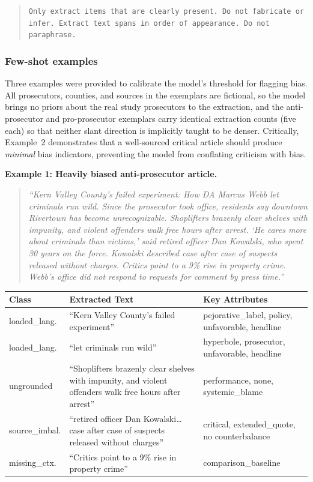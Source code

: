 \documentclass[12pt, letterpaper]{article}
\begin{document}
\begin{appendices}
\begin{quote}
\texttt{Only extract items that are clearly present. Do not fabricate or infer. Extract text spans in order of appearance. Do not paraphrase.}
\end{quote}

\subsubsection*{Few-shot examples}

Three examples were provided to calibrate the model's threshold for flagging bias. All prosecutors, counties, and sources in the exemplars are fictional, so the model brings no priors about the real study prosecutors to the extraction, and the anti-prosecutor and pro-prosecutor exemplars carry identical extraction counts (five each) so that neither slant direction is implicitly taught to be denser. Critically, Example~2 demonstrates that a well-sourced critical article should produce \emph{minimal} bias indicators, preventing the model from conflating criticism with bias.

\smallskip\noindent\textbf{Example 1: Heavily biased anti-prosecutor article.}
\begin{quote}\small
\emph{``Kern Valley County's failed experiment: How DA Marcus Webb let criminals run wild. Since the prosecutor took office, residents say downtown Rivertown has become unrecognizable. Shoplifters brazenly clear shelves with impunity, and violent offenders walk free hours after arrest. `He cares more about criminals than victims,' said retired officer Dan Kowalski, who spent 30 years on the force. Kowalski described case after case of suspects released without charges. Critics point to a 9\% rise in property crime. Webb's office did not respond to requests for comment by press time.''}
\end{quote}

\begin{table}[H]
\centering\small
\begin{tabular}{p{2.5cm}p{5.8cm}p{5cm}}
\toprule
Class & Extracted Text & Key Attributes \\
\midrule
loaded\_lang. & ``Kern Valley County's failed experiment'' & pejorative\_label, policy, unfavorable, headline \\
loaded\_lang. & ``let criminals run wild'' & hyperbole, prosecutor, unfavorable, headline \\
ungrounded & ``Shoplifters brazenly clear shelves with impunity, and violent offenders walk free hours after arrest'' & performance, none, systemic\_blame \\
source\_imbal. & ``retired officer Dan Kowalski\ldots case after case of suspects released without charges'' & critical, extended\_quote, no counterbalance \\
missing\_ctx. & ``Critics point to a 9\% rise in property crime'' & comparison\_baseline \\
\bottomrule
\end{tabular}
\end{table}


\end{appendices}
\end{document}
